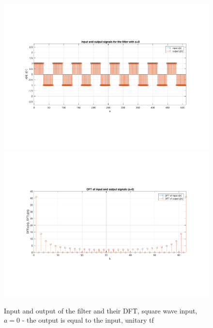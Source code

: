 \begin{figure} [H]
	\centering
	\includegraphics[trim={2.5cm 5cm 2.5cm 5cm}, clip, width=0.75\linewidth]{io_sw_4}
	\includegraphics[trim={2.5cm 5cm 2.5cm 5cm}, clip, width=0.75\linewidth]{dft_sw_4}
	\caption{Input and output of the filter and their DFT, square wave input, $a=0$ - the output is equal to the input, unitary tf}
	\label{fig:t1_io_sw_4}
\end{figure}
